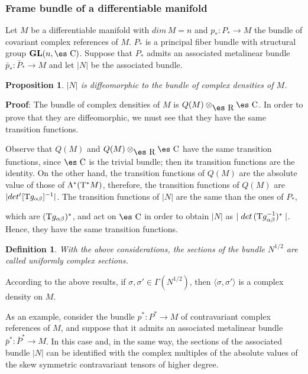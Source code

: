 \documentclass[12pt]{article}
\newtheorem{prop}{Proposition}
\newtheorem{definition}{Definition}
\def\qed{\ifvmode\removelastskip\fi
{\unskip\nobreak\hfil\penalty50\hbox{}\nobreak\hfil
\hbox{\vrule height1.2ex width1.2ex}\parfillskip=0pt
\finalhyphendemerits=0 \par\smallskip}}
\def\GL{{\bf GL}(n,\Complex )}
\def\Real{\mbox{\es R}}
\def\Complex{\mbox{\es C}}
\def\Tan{{\rm T}}
\begin{document}
\subsubsection{Frame bundle of a differentiable manifold}


Let $M$ be a differentiable manifold with $dim\, M = n$ and
$p_* \colon P_* \to M$ the bundle of covariant complex references of
$M$.
$P_*$ is a principal fiber bundle with structural group $\GL$.
Suppose that $P_*$ admits an associated metalinear bundle
$\bar p_* \colon \bar P_* \to M$ and let $| N |$ be the associated
bundle.

\begin{prop}
$| N |$ is diffeomorphic to the bundle of complex densities of $M$.
\end{prop}
{\bf Proof}: 
The bundle of complex densities  of $M$ is $Q(M) \otimes_{\Real}
\Complex$.
In order to prove that they are diffeomorphic, we must see that they
have the
same transition functions.

Observe that $Q(M)$ and $Q(M) \otimes_{\Real} \Complex$
have the same transition functions, since $\Complex$ is the trivial
bundle;
then its transition functions are the identity.
On the other hand, the transition functions of $Q(M)$
are the absolute value of those of $\Lambda^*(\Tan^*M)$,
therefore, the transition functions of $Q(M)$ are $| det ^t[\Tan
g_{\alpha \beta }]^{-1} |$.
The transition functions of $| N |$ are the same than the ones of $P_*$,

which are $(\Tan g_{\alpha \beta })^*$,
and act on $\Complex$ in order to obtain $| N |$ as
$\mid det\, (\Tan g_{\alpha \beta }^{-1})^*\mid$. Hence, they have the
same transition functions.
\qed

\begin{definition}
With the above considerations, the sections of the bundle $N^{1/2}$
are called {\rm uniformly complex sections}.
\end{definition}

According to the above results, if $\sigma , \sigma '\in \Gamma
(N^{1/2})$,
then $\langle \sigma ,\sigma ' \rangle$ is a complex density on $M$.

As an example, consider the bundle $p^* \colon P^* \to M$
of contravariant complex references of $M$,
and suppose that it admits an associated metalinear bundle
$\bar p^* \colon \bar P^* \to M$. In this case and,
in the same way, the sections of the associated bundle
$| N |$ can be identified with the complex multiples
of the absolute values of the skew symmetric contravariant tensors of
higher degree.
\end{document}
